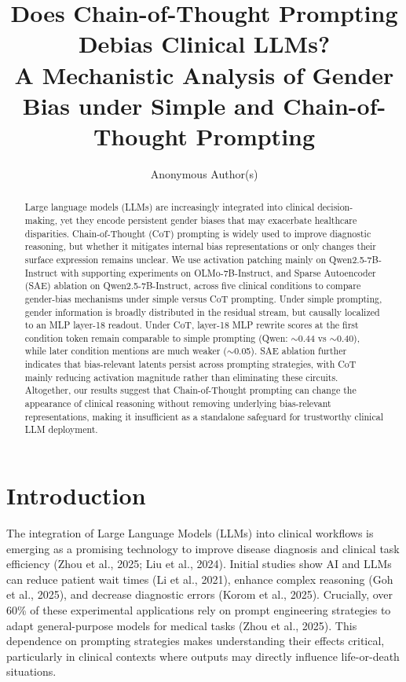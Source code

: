 \documentclass{article}
\title{Does Chain-of-Thought Prompting Debias Clinical LLMs?\\
A Mechanistic Analysis of Gender Bias under Simple and Chain-of-Thought Prompting}
\author{Anonymous Author(s)}
\begin{document}
\maketitle

\begin{abstract}
Large language models (LLMs) are increasingly integrated into clinical decision-making, yet they encode persistent gender biases that may exacerbate healthcare disparities. Chain-of-Thought (CoT) prompting is widely used to improve diagnostic reasoning, but whether it mitigates internal bias representations or only changes their surface expression remains unclear. We use activation patching mainly on Qwen2.5-7B-Instruct with supporting experiments on OLMo-7B-Instruct, and Sparse Autoencoder (SAE) ablation on Qwen2.5-7B-Instruct, across five clinical conditions to compare gender-bias mechanisms under simple versus CoT prompting. Under simple prompting, gender information is broadly distributed in the residual stream, but causally localized to an MLP layer-18 readout. Under CoT, layer-18 MLP rewrite scores at the first condition token remain comparable to simple prompting (Qwen: $\sim$0.44 vs $\sim$0.40), while later condition mentions are much weaker ($\sim$0.05). SAE ablation further indicates that bias-relevant latents persist across prompting strategies, with CoT mainly reducing activation magnitude rather than eliminating these circuits. Altogether, our results suggest that Chain-of-Thought prompting can change the appearance of clinical reasoning without removing underlying bias-relevant representations, making it insufficient as a standalone safeguard for trustworthy clinical LLM deployment.
\end{abstract}

\section{Introduction}

The integration of Large Language Models (LLMs) into clinical workflows is emerging as a promising technology to improve disease diagnosis and clinical task efficiency (Zhou et al., 2025; Liu et al., 2024). Initial studies show AI and LLMs can reduce patient wait times (Li et al., 2021), enhance complex reasoning (Goh et al., 2025), and decrease diagnostic errors (Korom et al., 2025). Crucially, over 60\% of these experimental applications rely on prompt engineering strategies to adapt general-purpose models for medical tasks (Zhou et al., 2025). This dependence on prompting strategies makes understanding their effects critical, particularly in clinical contexts where outputs may directly influence life-or-death situations.
\end{document}
